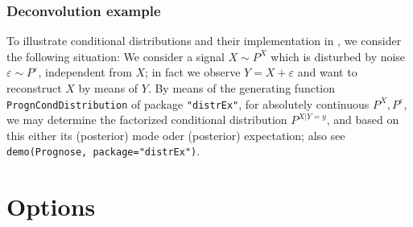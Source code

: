 \documentclass[11pt]{article}
\newcommand{\code}[1]{{\tt #1}}
\newcommand{\pkg}[1]{{\tt "#1"}}
\begin{document}
\subsubsection{Deconvolution example}

To illustrate conditional distributions and their implementation in 
\linebreak[4]\pkg{distrEx}, we consider the following situation:
We consider a signal $X\sim P^X$ which is disturbed by noise 
$\varepsilon\sim P^\varepsilon$, independent from $X$; in fact we observe
$Y=X+\varepsilon$ and want to reconstruct $X$ by means of $Y$. By means of the 
generating function \code{PrognCondDistribution}
of package \pkg{distrEx}, for absolutely continuous $P^X, P^\varepsilon$, we may 
determine the factorized conditional distribution $P^{X|Y=y}$, and based on this 
either its (posterior) mode oder (posterior) expectation; also see
\code{demo(Prognose, package="distrEx")}.

\section{Options}\label{options}
\end{document}
